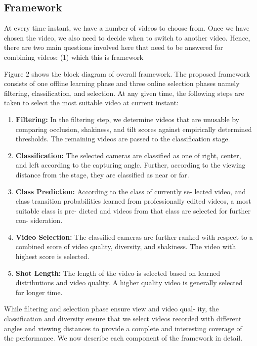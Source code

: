 \documentclass{sig-alternate}
\begin{document}
\subsection{Framework}
At every time instant, we have a number of videos to choose
from. Once we have chosen the video, we also need to decide when
to switch to another video. Hence, there are two main questions
involved here that need to be answered for combining videos: (1)
which this is framework

Figure 2 shows the block diagram of overall framework. The
proposed framework consists of one offline learning phase and three online selection phases namely filtering, classification, and selection. At any given time, the following steps are taken to select the
most suitable video at current instant:
\begin{enumerate}
\item \textbf{Filtering:} In the filtering step, we determine videos that are
unusable by comparing occlusion, shakiness, and tilt scores
against empirically determined thresholds. The remaining
videos are passed to the classification stage.
\item \textbf{Classification:} The selected cameras are classified as one
of right, center, and left according to the capturing angle.
Further, according to the viewing distance from the stage,
they are classified as near or far.
\item \textbf{Class Prediction:} According to the class of currently se-
lected video, and class transition probabilities learned from
professionally edited videos, a most suitable class is pre-
dicted and videos from that class are selected for further con-
sideration.
\item \textbf{Video Selection:} The classified cameras are further ranked
with respect to a combined score of video quality, diversity,
and shakiness. The video with highest score is selected.
\item \textbf{Shot Length:} The length of the video is selected based on
learned distributions and video quality. A higher quality video
is generally selected for longer time.

\end{enumerate}

While filtering and selection phase ensure view and video qual-
ity, the classification and diversity ensure that we select videos
recorded with different angles and viewing distances to provide a
complete and interesting coverage of the performance. We now
describe each component of the framework in detail.
\end{document}
